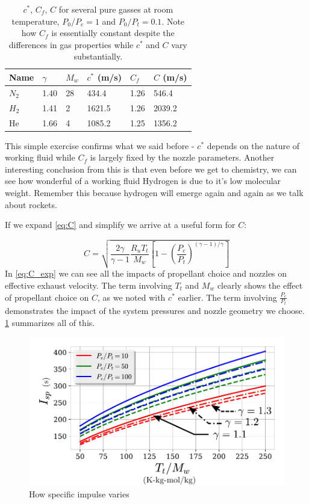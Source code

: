 \documentclass[twocolumn]{memoir} %
\begin{document}
\begin{table}[h]
\centering
\begin{tabular}{llllll}
\toprule
Name & $\gamma$ & $M_w$ & $c^*$ (m/s) & $C_f$ & $C$ (m/s) \\
\midrule
$N_2$ & 1.40 & 28 & 434.4 & 1.26 & 546.4 \\
$H_2$ & 1.41 & 2 & 1621.5 & 1.26 & 2039.2 \\
He & 1.66 & 4 & 1085.2 & 1.25 & 1356.2 \\

\bottomrule
\end{tabular}
        
\caption{$c^*$, $C_f$, $C$ for several pure gasses at room temperature,
        $P_0/P_e = 1$ and $P_0/P_t = 0.1$. Note how $C_f$ is essentially
        constant despite the differences in gas properties while $c^*$ and
        $C$ vary substantially.}    

\end{table}

This simple exercise confirms what we said before - $c^*$ depends on the nature of working fluid while $C_f$ is largely fixed by the nozzle parameters.  Another interesting conclusion from this is that even before we get to chemistry, we can
see how wonderful of a working fluid Hydrogen is due to it's low
molecular weight. Remember this because hydrogen will emerge again and
again as we talk about rockets.

If we expand \cref{eq:C} and simplify we arrive at a useful form for $C$:

\begin{equation}
    C = \sqrt{\frac{2 \gamma}{\gamma-1}\frac{R_u T_t}{M_w}\left[1 - \left(\frac{P_e}{P_t}\right)^{(\gamma - 1)/\gamma}\right]}
    \label{eq:C_exp}
\end{equation}
%
In \cref{eq:C_exp} we can see all the impacts of propellant choice and 
nozzles on effective exhaust velocity.  The term involving $T_t$ and $M_w$ clearly
shows the effect of propellant choice on $C$, as we noted with $c^*$ earlier.
The term involving $\frac{P_e}{P_t}$ demonstrates the impact of the system pressures
and nozzle geometry we choose.  \cref{fig:C} summarizes all of this.

\begin{figure}[h]
    \includegraphics[width=\columnwidth]{C_exp}
    \caption{How specific impulse varies}
    \label{fig:C}
\end{figure}
\end{document}
